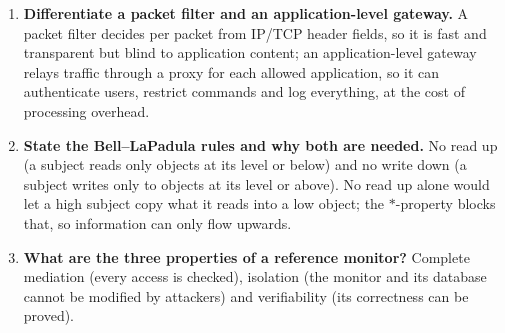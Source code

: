 \begin{enumerate}[leftmargin=1.6em,itemsep=3pt]
  \item \textbf{Differentiate a packet filter and an application-level gateway.} A packet filter decides per packet from IP/TCP header fields, so it is fast and transparent but blind to application content; an application-level gateway relays traffic through a proxy for each allowed application, so it can authenticate users, restrict commands and log everything, at the cost of processing overhead.
  \item \textbf{State the Bell--LaPadula rules and why both are needed.} No read up (a subject reads only objects at its level or below) and no write down (a subject writes only to objects at its level or above). No read up alone would let a high subject copy what it reads into a low object; the $*$-property blocks that, so information can only flow upwards.
  \item \textbf{What are the three properties of a reference monitor?} Complete mediation (every access is checked), isolation (the monitor and its database cannot be modified by attackers) and verifiability (its correctness can be proved).
\end{enumerate}


